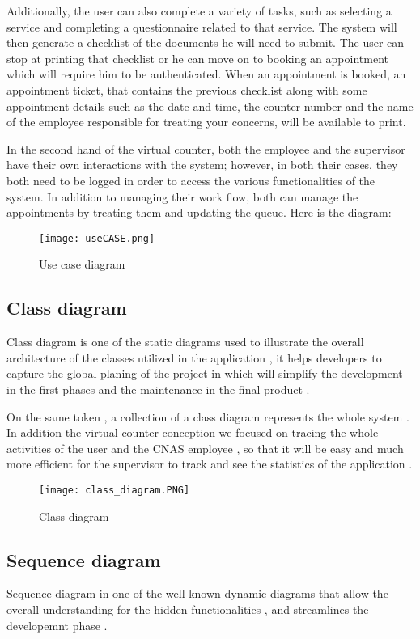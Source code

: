  Additionally, the user can also complete a variety of tasks, such as selecting a service and completing a questionnaire related to that service. The system will then generate a checklist of the documents he will need to submit. The user can stop at printing that checklist or he can move on to booking an appointment which will require him to be authenticated. When an appointment is booked, an appointment ticket, that contains the previous checklist along with some appointment details such as the date and time, the counter number and the name of the employee responsible for treating your concerns,  will be available to print. 
 
 \medskip In the second hand of the virtual counter, both the employee and the supervisor have their own interactions with the system; however, in both their cases, they both need to be logged in order to access the various functionalities of the system. In addition to managing their work flow, both can manage the appointments by treating them and updating the queue. 
\newpage
 \medskip Here is the diagram:

 \begin{figure}[H]
    \centering
    \texttt{[image: useCASE.png]}
    \caption{Use case diagram}
    \label{ucdiagram}
 \end{figure}
 
\subsection{Class diagram}
Class diagram is one of the static diagrams used to illustrate the overall architecture of the classes utilized in the application , it helps developers to capture the global planing of the project in which  will simplify the development in the first phases and the maintenance in the final product . 

\medskip On the same token , a collection of a class diagram represents the whole system . In addition the virtual counter conception we focused on tracing the whole activities of the user and the CNAS employee , so that it will be easy and much more efficient for the supervisor to track and see the statistics of the application . 

\begin{figure}[H]
    \centering
    \texttt{[image: class\_diagram.PNG]}
    \caption{Class diagram}
    \label{fig:Class diagram }
\end{figure}

\subsection{Sequence diagram}
Sequence diagram in one of the well known dynamic diagrams that allow the overall understanding for the hidden functionalities , and streamlines the developemnt phase . 

